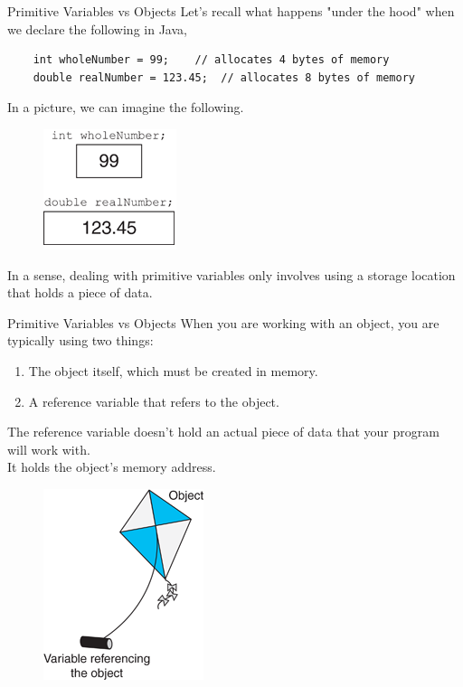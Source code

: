 \documentclass[11pt]{beamer}
\begin{document}
\begin{frame}[fragile]{Primitive Variables vs Objects}
    Let's recall what happens "under the hood" when we declare the following in Java,
    \begin{lstlisting}
    int wholeNumber = 99;    // allocates 4 bytes of memory
    double realNumber = 123.45;  // allocates 8 bytes of memory
    \end{lstlisting}
    In a picture, we can imagine the following.
    \noindent 
    \begin{figure}[H]
    \centering
    \includegraphics[scale=0.6]{Images/chapter06_NumberInBox.png}
    \end{figure}
    In a sense, dealing with primitive variables only  involves using a storage location that holds a piece of data.
\end{frame}

\begin{frame}{Primitive Variables vs Objects}
    When you are working with an object, you are typically using two things:
    \begin{enumerate}
        \item The object itself, which must be created in memory.
        \item A reference variable that refers to the object.
    \end{enumerate}

    The reference variable doesn't hold an actual piece of data that your program will work with. \\ \vspace{1em}
    It holds the object’s memory address.
    \noindent 
    \begin{figure}[H]
    \centering
    \includegraphics[scale=0.6]{Images/chapter06_ReferenceVariableAndObject.png}
    \end{figure}
\end{frame}
\end{document}
